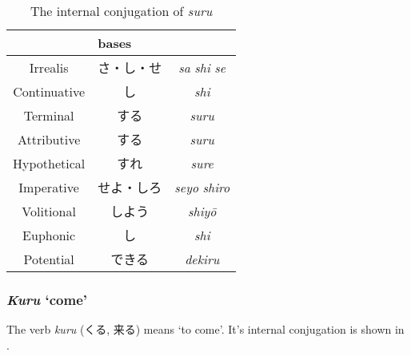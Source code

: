 \documentclass[UTF8, a4paper, oneside, scheme=plain]{ctexrep}
\newcommand{\corpus}[1]{\emph{#1}}
\newcommand{\translate}[1]{`#1'}
\begin{document}
\begin{table}[H]
    \caption{The internal conjugation of \corpus{suru}}
    \label{tbl:suru-table}
    \centering
    \begin{tabular}{ccc}
        \toprule
        \multicolumn{1}{l}{}           & \multicolumn{2}{l}{bases} \\
        \midrule
        Irrealis                       & さ・し・せ                   & \corpus{sa} \corpus{shi} \corpus{se}              \\
        Continuative                   & し                        & \corpus{shi}                   \\
        Terminal                       & する                      & \corpus{suru}                   \\
        Attributive                    & する                      & \corpus{suru}                   \\
        Hypothetical                   & すれ                      & \corpus{sure}                   \\
        Imperative                     & せよ・しろ             & \corpus{seyo} \corpus{shiro}             \\ 
        Volitional                     & しよう                 & \corpus{shiy\={o}} \\
        Euphonic                       & し                        & \corpus{shi}                   \\
        Potential                      & できる                 & \corpus{dekiru} \\
        \bottomrule
    \end{tabular}
\end{table}

\subsubsection{\corpus{Kuru} \translate{come}}

The verb \corpus{kuru} (くる, 来る) means \translate{to come}.
It's internal conjugation is shown in .
\end{document}
